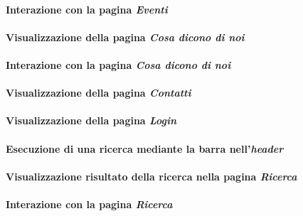 \paragraph{Interazione con la pagina \textit{Eventi}}
\label{analisi-casi-uso-attori-principali-utente-generico-6}

\paragraph{Visualizzazione della pagina \textit{Cosa dicono di noi}}
\label{analisi-casi-uso-attori-principali-utente-generico-7}

\paragraph{Interazione con la pagina \textit{Cosa dicono di noi}}
\label{analisi-casi-uso-attori-principali-utente-generico-8}

\paragraph{Visualizzazione della pagina \textit{Contatti}}
\label{analisi-casi-uso-attori-principali-utente-generico-9}

\paragraph{Visualizzazione della pagina \textit{Login}}
\label{analisi-casi-uso-attori-principali-utente-generico-10}

\paragraph{Esecuzione di una ricerca mediante la barra nell'\textit{header}}
\label{analisi-casi-uso-attori-principali-utente-generico-11}

\paragraph{Visualizzazione risultato della ricerca nella pagina \textit{Ricerca}}
\label{analisi-casi-uso-attori-principali-utente-generico-12}

\paragraph{Interazione con la pagina \textit{Ricerca}}
\label{analisi-casi-uso-attori-principali-utente-generico-13}

